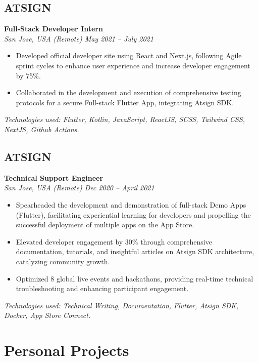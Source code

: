 \documentclass[10pt,letterpaper]{article} %
\newcommand{\jobDetailsLine}[1]{\noindent\textit{#1}\par\vspace{0.5ex}}
\begin{document}
\subsection*{ATSIGN}
\noindent\textbf{Full-Stack Developer Intern} \\
\jobDetailsLine{San Jose, USA (Remote) \textbullet{} May 2021 – July 2021}
\begin{itemize}
    \item Developed official developer site using React and Next.js, following Agile sprint cycles to enhance user experience and increase developer engagement by 75\%.
    \item Collaborated in the development and execution of comprehensive testing protocols for a secure Full-stack Flutter App, integrating Atsign SDK.
\end{itemize}
\textit{Technologies used: Flutter, Kotlin, JavaScript, ReactJS, SCSS, Tailwind CSS, NextJS, Github Actions.}
\vspace{1ex}

\subsection*{ATSIGN}
\noindent\textbf{Technical Support Engineer} \\
\jobDetailsLine{San Jose, USA (Remote) \textbullet{} Dec 2020 – April 2021}
\begin{itemize}
    \item Spearheaded the development and demonstration of full-stack Demo Apps (Flutter), facilitating experiential learning for developers and propelling the successful deployment of multiple apps on the App Store.
    \item Elevated developer engagement by 30\% through comprehensive documentation, tutorials, and insightful articles on Atsign SDK architecture, catalyzing community growth.
    \item Optimized 8 global live events and hackathons, providing real-time technical troubleshooting and enhancing participant engagement.
\end{itemize}
\textit{Technologies used: Technical Writing, Documentation, Flutter, Atsign SDK, Docker, App Store Connect.}
\vspace{1ex}


\section{Personal Projects}
\end{document}

